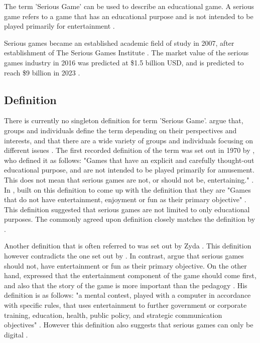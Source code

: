 \documentclass[a4paper,11.5pt]{report}
\numberwithin{figure}{section}
\numberwithin{table}{section}
\numberwithin{equation}{section}
\numberwithin{equation}{section}
\begin{document}
The term 'Serious Game' can be used to describe an educational game. A serious game refers to a game that has an educational purpose and is not intended to be played primarily for entertainment \citep{abt1970}. 

Serious games became an established academic field of study in 2007, after establishment of The Serious Games Institute \citep{Wilkinson2016}. The market value of the serious games industry in 2016 was predicted at \$1.5 billion USD, and is predicted to reach \$9 billion in 2023 \citep{alliedmarketresearch}.

\subsection{Definition}

There is currently no singleton definition for term 'Serious Game'. \citeauthor{Johann2015} argue that, groups and individuals define the term depending on their perspectives and interests, and that there are a wide variety of groups and individuals focusing on different issues \citep{Johann2015}. The first recorded definition of the term was set out in 1970 by \citeauthor{abt1970} \citep{Wilkinson2016}, who defined it as follows: "Games that have an explicit and carefully thought-out educational purpose, and are not intended to be played primarily for amusement. This does not mean that serious games are not, or should not be, entertaining." \citep{abt1970}. In \citeyear{Michael2005}, \citeauthor{Michael2005} built on this definition to come up with the definition that they are "Games that do not have entertainment, enjoyment or fun as their primary objective" \citep{Michael2005}. This definition suggested that serious games are not limited to only educational purposes. The commonly agreed upon definition closely matches the definition by \citeauthor{Michael2005} \citep[see][]{Johann2015}.

Another definition that is often referred to was set out by Zyda \citep[see][]{Johann2015}. This definition however contradicts the one set out by \citeauthor{Michael2005} \citep{Johann2015}. In contrast, \citeauthor{Michael2005} argue that serious games should not, have entertainment or fun as their primary objective. On the other hand, \citeauthor{Zyda2005} expressed that the entertainment component of the game should come first, and also that the story of the game is more important than the pedagogy \citep{Zyda2005}. His definition is as follows: "a mental contest, played with a computer in accordance with specific rules, that uses entertainment to further government or corporate training, education, health, public policy, and strategic communication objectives" \citep{Zyda2005}. However this definition also suggests that serious games can only be digital \citep{Jean}. 
\end{document}
